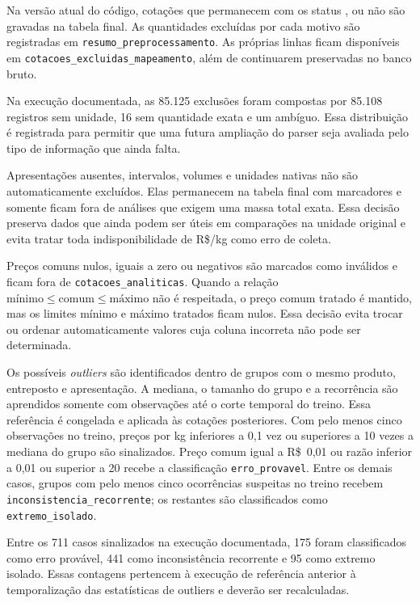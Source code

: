 \documentclass[12pt,a4paper]{article}
\begin{document}
Na versão atual do código, cotações que permanecem com os status
,  ou  não são
gravadas na tabela final. As quantidades excluídas por cada motivo são
registradas em \texttt{resumo\_preprocessamento}. As próprias linhas ficam
disponíveis em \texttt{cotacoes\_excluidas\_mapeamento}, além de continuarem
preservadas no banco bruto.

Na execução documentada, as 85.125 exclusões foram compostas por 85.108
registros sem unidade, 16 sem quantidade exata e um ambíguo. Essa
distribuição é registrada para permitir que uma futura ampliação do parser
seja avaliada pelo tipo de informação que ainda falta.

Apresentações ausentes, intervalos, volumes e unidades nativas não são
automaticamente excluídos. Elas permanecem na tabela final com marcadores e
somente ficam fora de análises que exigem uma massa total exata. Essa decisão
preserva dados que ainda podem ser úteis em comparações na unidade original e
evita tratar toda indisponibilidade de R\$/kg como erro de coleta.

Preços comuns nulos, iguais a zero ou negativos são marcados como inválidos e
ficam fora de \texttt{cotacoes\_analiticas}. Quando a relação
$\text{mínimo} \leq \text{comum} \leq \text{máximo}$ não é respeitada, o preço
comum tratado é mantido, mas os limites mínimo e máximo tratados ficam nulos.
Essa decisão evita trocar ou ordenar automaticamente valores cuja coluna
incorreta não pode ser determinada.

Os possíveis \textit{outliers} são identificados dentro de grupos com o mesmo
produto, entreposto e apresentação. A mediana, o tamanho do grupo e a
recorrência são aprendidos somente com observações até o corte temporal do
treino. Essa referência é congelada e aplicada às cotações posteriores. Com
pelo menos cinco observações no treino, preços por kg inferiores a 0,1 vez ou
superiores a 10 vezes a mediana do grupo são sinalizados. Preço comum igual a
R\$~0,01 ou razão inferior a 0,01 ou superior a 20 recebe a classificação
\texttt{erro\_provavel}. Entre os demais casos, grupos com pelo menos cinco
ocorrências suspeitas no treino recebem \texttt{inconsistencia\_recorrente}; os
restantes são classificados como \texttt{extremo\_isolado}.

Entre os 711 casos sinalizados na execução documentada, 175 foram classificados
como erro provável, 441 como inconsistência recorrente e 95 como extremo
isolado. Essas contagens pertencem à execução de referência anterior à
temporalização das estatísticas de outliers e deverão ser recalculadas.
\end{document}
